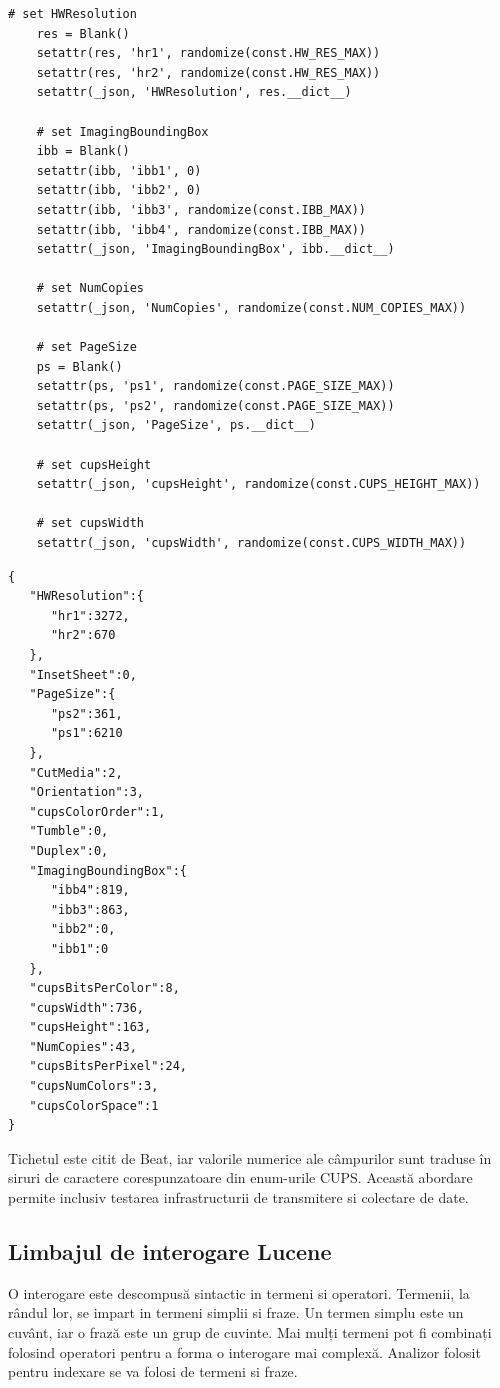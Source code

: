 \documentclass[a4paper, 12pt, twoside]{report}
\begin{document}
\begin{lstlisting}[caption={cazurile speciale, tratate individual - Python},captionpos=b]
# set HWResolution        
    res = Blank()
    setattr(res, 'hr1', randomize(const.HW_RES_MAX))
    setattr(res, 'hr2', randomize(const.HW_RES_MAX))
    setattr(_json, 'HWResolution', res.__dict__)

    # set ImagingBoundingBox
    ibb = Blank()
    setattr(ibb, 'ibb1', 0)
    setattr(ibb, 'ibb2', 0)
    setattr(ibb, 'ibb3', randomize(const.IBB_MAX))
    setattr(ibb, 'ibb4', randomize(const.IBB_MAX))
    setattr(_json, 'ImagingBoundingBox', ibb.__dict__)

    # set NumCopies
    setattr(_json, 'NumCopies', randomize(const.NUM_COPIES_MAX))

    # set PageSize
    ps = Blank()
    setattr(ps, 'ps1', randomize(const.PAGE_SIZE_MAX))
    setattr(ps, 'ps2', randomize(const.PAGE_SIZE_MAX))
    setattr(_json, 'PageSize', ps.__dict__)

    # set cupsHeight
    setattr(_json, 'cupsHeight', randomize(const.CUPS_HEIGHT_MAX))

    # set cupsWidth
    setattr(_json, 'cupsWidth', randomize(const.CUPS_WIDTH_MAX))
\end{lstlisting}
\begin{lstlisting}[caption={exemplu de output pentru programul de mai sus - JSON},captionpos=b]
{  
   "HWResolution":{  
      "hr1":3272,
      "hr2":670
   },
   "InsetSheet":0,
   "PageSize":{  
      "ps2":361,
      "ps1":6210
   },
   "CutMedia":2,
   "Orientation":3,
   "cupsColorOrder":1,
   "Tumble":0,
   "Duplex":0,
   "ImagingBoundingBox":{  
      "ibb4":819,
      "ibb3":863,
      "ibb2":0,
      "ibb1":0
   },
   "cupsBitsPerColor":8,
   "cupsWidth":736,
   "cupsHeight":163,
   "NumCopies":43,
   "cupsBitsPerPixel":24,
   "cupsNumColors":3,
   "cupsColorSpace":1
}
\end{lstlisting}
Tichetul este citit de Beat, iar valorile numerice ale câmpurilor sunt traduse în siruri de caractere corespunzatoare din enum-urile CUPS. 
Această abordare permite inclusiv testarea infrastructurii de transmitere si colectare de date.

	\subsection{Limbajul de interogare Lucene}
O interogare este descompusă sintactic in termeni si operatori. Termenii, la rândul lor, se impart in termeni simplii si fraze. Un termen simplu este un cuvânt, iar o frază este un grup de cuvinte. Mai mulți termeni pot fi combinați folosind operatori pentru a forma o interogare mai complexă. Analizor folosit pentru indexare se va folosi de termeni si fraze.
\end{document}

